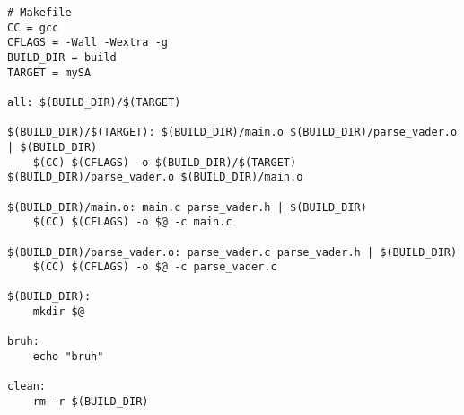 \documentclass{article}
\theoremstyle{mytheoremstyle}
\theoremstyle{mytheoremstyle}
\theoremstyle{myproblemstyle}
\begin{document}
    \begin{lstlisting}
# Makefile
CC = gcc
CFLAGS = -Wall -Wextra -g
BUILD_DIR = build
TARGET = mySA

all: $(BUILD_DIR)/$(TARGET)

$(BUILD_DIR)/$(TARGET): $(BUILD_DIR)/main.o $(BUILD_DIR)/parse_vader.o | $(BUILD_DIR)
	$(CC) $(CFLAGS) -o $(BUILD_DIR)/$(TARGET) $(BUILD_DIR)/parse_vader.o $(BUILD_DIR)/main.o

$(BUILD_DIR)/main.o: main.c parse_vader.h | $(BUILD_DIR)
	$(CC) $(CFLAGS) -o $@ -c main.c

$(BUILD_DIR)/parse_vader.o: parse_vader.c parse_vader.h | $(BUILD_DIR)
	$(CC) $(CFLAGS) -o $@ -c parse_vader.c

$(BUILD_DIR):
	mkdir $@

bruh:
	echo "bruh"

clean: 
	rm -r $(BUILD_DIR)
    \end{lstlisting}
\end{document}
